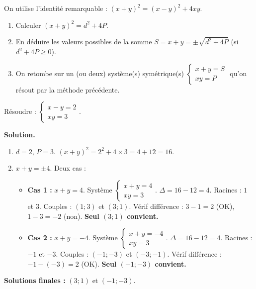 \documentclass[11pt]{article}
\begin{document}
\begin{methode}
On utilise l'identité remarquable : $(x+y)^2 = (x-y)^2 + 4xy$.
\begin{enumerate}
    \item Calculer $(x+y)^2 = d^2 + 4P$.
    \item En déduire les valeurs possibles de la somme $S = x+y = \pm\sqrt{d^2 + 4P}$ (si $d^2+4P \ge 0$).
    \item On retombe sur un (ou deux) système(s) symétrique(s) $\begin{cases} x+y=S \\ xy=P \end{cases}$ qu'on résout par la méthode précédente.
\end{enumerate}
\end{methode}

\begin{exoresolu}
Résoudre : $\begin{cases} x - y = 2 \\ xy = 3 \end{cases}$.

\medskip
\noindent \textbf{Solution.}
\begin{enumerate}
    \item $d=2$, $P=3$. $(x+y)^2 = 2^2 + 4\times 3 = 4 + 12 = 16$.
    \item $x+y = \pm 4$. Deux cas :
    \begin{itemize}
        \item \textbf{Cas 1 :} $x+y=4$. Système $\begin{cases} x+y=4 \\ xy=3 \end{cases}$.
              $\Delta = 16 - 12 = 4$. Racines : $1$ et $3$. Couples : $(1;3)$ et $(3;1)$.
              Vérif différence : $3-1=2$ (OK), $1-3=-2$ (non). \textbf{Seul $(3;1)$ convient.}
        \item \textbf{Cas 2 :} $x+y=-4$. Système $\begin{cases} x+y=-4 \\ xy=3 \end{cases}$.
              $\Delta = 16 - 12 = 4$. Racines : $-1$ et $-3$. Couples : $(-1;-3)$ et $(-3;-1)$.
              Vérif différence : $-1 - (-3) = 2$ (OK). \textbf{Seul $(-1;-3)$ convient.}
    \end{itemize}
\end{enumerate}
\noindent \textbf{Solutions finales :} $(3; 1)$ et $(-1; -3)$.
\end{exoresolu}
\end{document}
